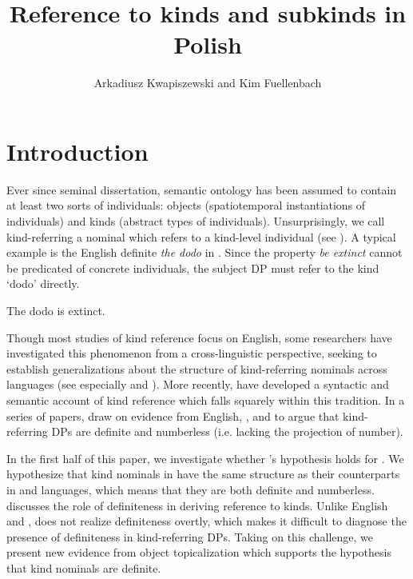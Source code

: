 \documentclass[output=paper]{langscibook}
\author{Arkadiusz Kwapiszewski\orcid{0000-0002-2957-0862}\affiliation{University of Oxford} and Kim Fuellenbach\orcid{0000-0003-4836-1617}\affiliation{University of Oxford}}
\title[Reference to kinds and subkinds in Polish]
      {Reference to kinds and subkinds in Polish}
\begin{document}
\maketitle


\section{Introduction}

Ever since  seminal dissertation, semantic ontology has been assumed to contain at least two sorts of individuals: objects (spatiotemporal instantiations of individuals) and kinds (abstract types of individuals). Unsurprisingly, we call kind-referring a nominal which refers to a kind-level individual (see \citealt{Krifka1995}). A typical example is the English definite \textit{the dodo} in . Since the property \textit{be extinct} cannot be predicated of concrete individuals, the subject DP must refer to the kind `dodo' directly.

\ea The dodo is extinct. \label{ex:dodo}
\z

\noindent
Though most studies of kind reference focus on English, some researchers have investigated this phenomenon from a cross-linguistic perspective, seeking to establish generalizations about the structure of kind-referring nominals across languages (see especially \citealt{Chierchia1998} and \citealt{Dayal2004}). More recently, \citeauthor{Borik.Espinal2012} have developed a syntactic and semantic account of kind reference which falls squarely within this tradition. In a series of papers, \citet{Borik.Espinal2012, Borik.Espinal2015, Borik.Espinal2016, Borik.Espinal2018} draw on evidence from English, , and  to argue that kind-referring DPs are definite and numberless (i.e. lacking the projection of number).\largerpage

In the first half of this paper, we investigate whether \citeauthor{Borik.Espinal2012}'s hypothesis holds for . We hypothesize that kind nominals in  have the same structure as their counterparts in  and  languages, which means that they are both definite and numberless.  discusses the role of definiteness in deriving reference to kinds. Unlike English and ,  does not realize definiteness overtly, which makes it difficult to diagnose the presence of definiteness in kind-referring DPs. Taking on this challenge, we present new evidence from object topicalization which supports the hypothesis that  kind nominals are definite.
\end{document}
